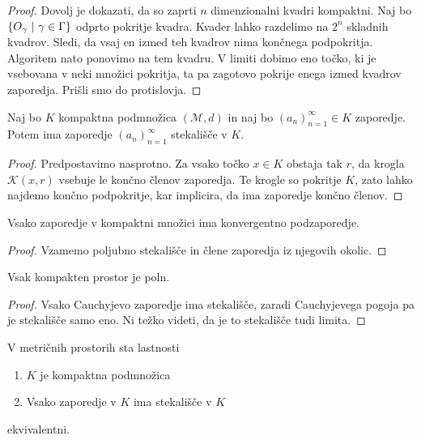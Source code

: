 \documentclass[12pt, a4paper]{article}
\begin{document}
\begin{proof}
Dovolj je dokazati, da so zaprti $n$ dimenzionalni kvadri kompaktni. Naj bo $\left\{O_\gamma~\middle\vert~\gamma\in\Gamma\right\}$ odprto pokritje kvadra. Kvader lahko razdelimo na $2^n$ skladnih kvadrov. Sledi, da vsaj en izmed teh kvadrov nima končnega podpokritja. Algoritem nato ponovimo na tem kvadru. V limiti dobimo eno točko, ki je vsebovana v neki množici pokritja, ta pa zagotovo pokrije enega izmed kvadrov zaporedja. Prišli smo do protislovja.
\end{proof}

\begin{izrek}
Naj bo $K$ kompaktna podmnožica $(\mathcal{M},d)$ in naj bo $(a_n)_{n=1}^\infty\in K$ zaporedje. Potem ima zaporedje $(a_n)_{n=1}^\infty$ stekališče v $K$.
\end{izrek}

\begin{proof}
Predpostavimo nasprotno. Za vsako točko $x\in K$ obstaja tak $r$, da krogla $\mathcal{K}(x,r)$ vsebuje le končno členov zaporedja. Te krogle so pokritje $K$, zato lahko najdemo končno podpokritje, kar implicira, da ima zaporedje končno členov.
\end{proof}

\begin{posledica}
Vsako zaporedje v kompaktni množici ima konvergentno podzaporedje.
\end{posledica}

\begin{proof}
Vzamemo poljubno stekališče in člene zaporedja iz njegovih okolic.
\end{proof}

\begin{posledica}
Vsak kompakten prostor je poln.
\end{posledica}

\begin{proof}
Vsako Cauchyjevo zaporedje ima stekališče, zaradi Cauchyjevega pogoja pa je stekališče samo eno. Ni težko videti, da je to stekališče tudi limita.
\end{proof}

\begin{opomba}
V metričnih prostorih sta lastnosti

\begin{enumerate}[label=\roman*)]
\item $K$ je kompaktna podmnožica
\item Vsako zaporedje v $K$ ima stekališče v $K$
\end{enumerate}

ekvivalentni.
\end{opomba}
\end{document}
